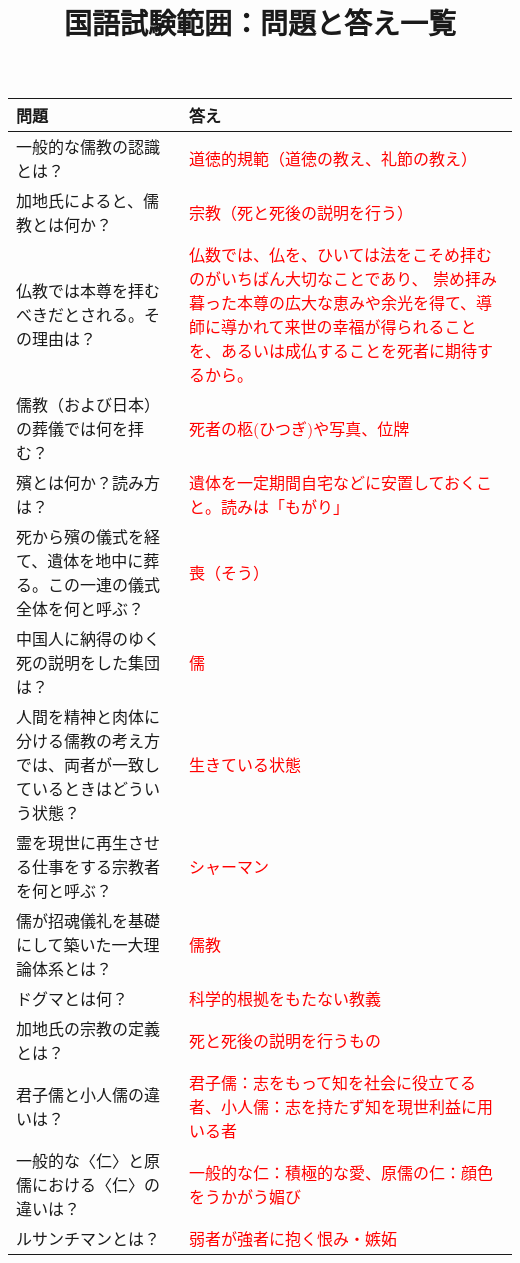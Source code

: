 \documentclass[a4paper,10pt]{article}
\title{国語試験範囲：問題と答え一覧}
\date{}
\begin{document}
\maketitle

\begin{longtable}{|p{}|p{}|}
\hline
\textbf{問題} & \textbf{答え} \\ \hline
一般的な儒教の認識とは？ & \textcolor{red}{道徳的規範（道徳の教え、礼節の教え）} \\ \hline
加地氏によると、儒教とは何か？ & \textcolor{red}{宗教（死と死後の説明を行う）} \\ \hline
仏教では本尊を拝むべきだとされる。その理由は？ & \textcolor{red}{仏数では、仏を、ひいては法をこそめ拝むのがいちばん大切なことであり、
崇め拝み暮った本尊の広大な恵みや余光を得て、導師に導かれて来世の幸福が得られることを、あるいは成仏することを死者に期待するから。} \\ \hline
儒教（および日本）の葬儀では何を拝む？ & \textcolor{red}{死者の柩(ひつぎ)や写真、位牌} \\ \hline
殯とは何か？読み方は？ & \textcolor{red}{遺体を一定期間自宅などに安置しておくこと。読みは「もがり」} \\ \hline
死から殯の儀式を経て、遺体を地中に葬る。この一連の儀式全体を何と呼ぶ？ & \textcolor{red}{喪（そう）} \\ \hline
中国人に納得のゆく死の説明をした集団は？ & \textcolor{red}{儒} \\ \hline
人間を精神と肉体に分ける儒教の考え方では、両者が一致しているときはどういう状態？ & \textcolor{red}{生きている状態} \\ \hline
霊を現世に再生させる仕事をする宗教者を何と呼ぶ？ & \textcolor{red}{シャーマン} \\ \hline
儒が招魂儀礼を基礎にして築いた一大理論体系とは？ & \textcolor{red}{儒教} \\ \hline
ドグマとは何？ & \textcolor{red}{科学的根拠をもたない教義} \\ \hline
加地氏の宗教の定義とは？ & \textcolor{red}{死と死後の説明を行うもの} \\ \hline
君子儒と小人儒の違いは？ & \textcolor{red}{君子儒：志をもって知を社会に役立てる者、小人儒：志を持たず知を現世利益に用いる者} \\ \hline
一般的な〈仁〉と原儒における〈仁〉の違いは？ & \textcolor{red}{一般的な仁：積極的な愛、原儒の仁：顔色をうかがう媚び} \\ \hline
ルサンチマンとは？ & \textcolor{red}{弱者が強者に抱く恨み・嫉妬} \\ \hline

\end{longtable}
\end{document}
